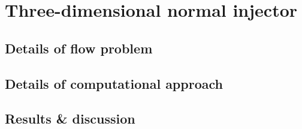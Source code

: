 \newpage
\section{Three-dimensional normal injector}
\label{chapter-3Dinjector}
%

\subsection{Details of flow problem}

\subsection{Details of computational approach}

\subsection{Results \& discussion}
